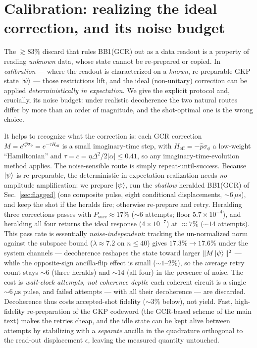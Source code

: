 \documentclass[11pt]{article}
\begin{document}
\section{Calibration: realizing the ideal correction, and its noise budget}\label{sec:calibration}
The $\gtrsim83\%$ discard that rules BB1(GCR) out as a data readout is a property of reading
\emph{unknown} data, whose state cannot be re-prepared or copied. In \emph{calibration} --- where the
readout is characterized on a \emph{known}, re-preparable GKP state $\ket\psi$ --- those restrictions
lift, and the ideal (non-unitary) correction can be applied \emph{deterministically in expectation}.
We give the explicit protocol and, crucially, its noise budget: under realistic decoherence the two
natural routes differ by more than an order of magnitude, and the shot-optimal one is the wrong choice.

It helps to recognize what the correction is: each GCR correction
$M=e^{c\hat p\sigma_\phi}=e^{-\tau H_{\mathrm{eff}}}$ is a small imaginary-time step, with
$H_{\mathrm{eff}}=-\hat p\sigma_\phi$ a low-weight ``Hamiltonian'' and
$\tau=c=\eta\Delta^2/2|\alpha|\le0.41$, so any imaginary-time-evolution method applies. The
noise-sensible route is simply repeat-until-success. Because $\ket\psi$ is re-preparable, the
deterministic-in-expectation realization needs \emph{no} amplitude amplification: we prepare $\ket\psi$,
run the \emph{shallow} heralded BB1(GCR) of Sec.~\ref{sec:flagged} (one composite pulse, eight
conditional displacements, $\sim\!6\,\mu\mathrm{s}$), and keep the shot if the heralds fire; otherwise
re-prepare and retry. Heralding three corrections passes with $P_{\mathrm{succ}}\approx17\%$
($\sim\!6$ attempts; floor $5.7\times10^{-4}$), and heralding all four returns the ideal response
($4\times10^{-7}$) at $\approx7\%$ ($\sim\!14$ attempts). This pass rate is essentially
\emph{noise-independent}: tracking the un-normalized norm against the subspace bound
($\lambda\approx7.2$ on $n\le40$) gives $17.3\%\to17.6\%$ under the system channels --- decoherence
reshapes the state toward larger $\|M\ket\psi\|^2$ --- while the opposite-sign ancilla-flip effect is
small ($\sim\!1$--$2\%$), so the average retry count stays $\sim\!6$ (three heralds) and $\sim\!14$
(all four) in the presence of noise. The cost is \emph{wall-clock attempts, not
coherence depth}: each coherent circuit is a single $\sim\!6\,\mu\mathrm{s}$ pulse, and failed attempts
--- with all their decoherence --- are discarded. Decoherence thus costs accepted-shot fidelity
($\sim\!3\%$ below), not yield. Fast, high-fidelity re-preparation of the GKP
codeword (the GCR-based scheme of the main text) makes the retries cheap, and the idle state can be
kept alive between attempts by stabilizing with a \emph{separate} ancilla in the quadrature orthogonal
to the read-out displacement $\epsilon$, leaving the measured quantity untouched.
\end{document}

